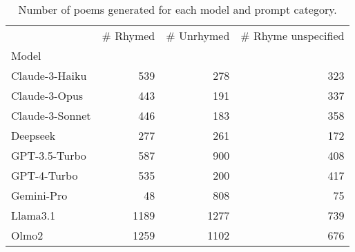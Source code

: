 \begin{table}[H]
  \centering
  \small
  \singlespacing
  \begin{tabular}{lrrr}
  \toprule
   & \# Rhymed & \# Unrhymed & \# Rhyme unspecified \\
  Model &  &  &  \\
  \midrule
  Claude-3-Haiku & 539 & 278 & 323 \\
  Claude-3-Opus & 443 & 191 & 337 \\
  Claude-3-Sonnet & 446 & 183 & 358 \\
  Deepseek & 277 & 261 & 172 \\
  GPT-3.5-Turbo & 587 & 900 & 408 \\
  GPT-4-Turbo & 535 & 200 & 417 \\
  Gemini-Pro & 48 & 808 & 75 \\
  Llama3.1 & 1189 & 1277 & 739 \\
  Olmo2 & 1259 & 1102 & 676 \\
  \bottomrule
  \end{tabular}
  \caption{Number of poems generated for each model and prompt category.}
  \label{tab:num_poems_models}
\end{table}